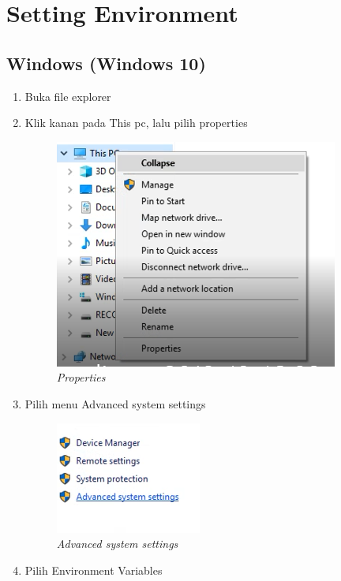 \section{Setting Environment}
\subsection{Windows (Windows 10)}
\begin{enumerate}
\item Buka file explorer
\item Klik kanan pada This pc, lalu pilih properties
\begin{figure}[H]
    \centering
    \includegraphics[scale=0.7]{figures/properties}
    \caption{\textit{Properties}}
    \label{Environment1}
\end{figure}
\item Pilih menu Advanced system settings
\begin{figure}[H]
    \centering
    \includegraphics[scale=0.7]{figures/advanced}
    \caption{\textit{Advanced system settings}}
    \label{Environment2}
\end{figure}
\item Pilih Environment Variables
\begin{figure}[H]
    \centering

\end{figure}
\end{enumerate}
